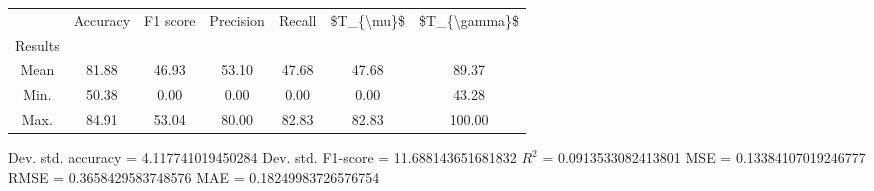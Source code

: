\begin{tabular}{|c|c|c|c|c|c|c|}
\toprule
{} &  Accuracy &  F1 score &  Precision &  Recall &  \$T\_\{\textbackslash mu\}\$ &  \$T\_\{\textbackslash gamma\}\$ \\
Results &           &           &            &         &            &               \\
\hline
Mean    &     81.88 &     46.93 &      53.10 &   47.68 &      47.68 &         89.37 \\
Min.    &     50.38 &      0.00 &       0.00 &    0.00 &       0.00 &         43.28 \\
Max.    &     84.91 &     53.04 &      80.00 &   82.83 &      82.83 &        100.00 \\
\bottomrule
\end{tabular}

 Dev. std. accuracy = 4.117741019450284
 Dev. std. F1-score = 11.688143651681832
 $R^2$ = 0.0913533082413801
 MSE = 0.13384107019246777
 RMSE = 0.3658429583748576
 MAE = 0.18249983726576754